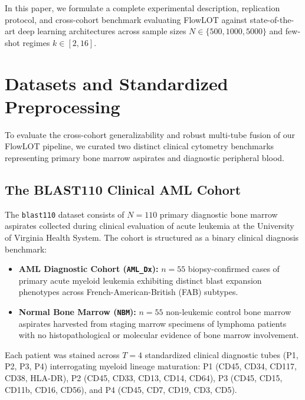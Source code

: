 \documentclass[10pt,journal,compsoc]{IEEEtran}
\begin{document}
In this paper, we formulate a complete experimental description, replication protocol, and cross-cohort benchmark evaluating FlowLOT against state-of-the-art deep learning architectures across sample sizes $N \in \{500, 1000, 5000\}$ and few-shot regimes $k \in [2, 16]$.

\section{Datasets and Standardized Preprocessing}

To evaluate the cross-cohort generalizability and robust multi-tube fusion of our FlowLOT pipeline, we curated two distinct clinical cytometry benchmarks representing primary bone marrow aspirates and diagnostic peripheral blood.

\subsection{The BLAST110 Clinical AML Cohort}
The \texttt{blast110} dataset consists of $N=110$ primary diagnostic bone marrow aspirates collected during clinical evaluation of acute leukemia at the University of Virginia Health System. The cohort is structured as a binary clinical diagnosis benchmark:
\begin{itemize}
    \item \textbf{AML Diagnostic Cohort (\texttt{AML\_Dx}):} $n=55$ biopsy-confirmed cases of primary acute myeloid leukemia exhibiting distinct blast expansion phenotypes across French-American-British (FAB) subtypes.
    \item \textbf{Normal Bone Marrow (\texttt{NBM}):} $n=55$ non-leukemic control bone marrow aspirates harvested from staging marrow specimens of lymphoma patients with no histopathological or molecular evidence of bone marrow involvement.
\end{itemize}
Each patient was stained across $T=4$ standardized clinical diagnostic tubes (P1, P2, P3, P4) interrogating myeloid lineage maturation: P1 (CD45, CD34, CD117, CD38, HLA-DR), P2 (CD45, CD33, CD13, CD14, CD64), P3 (CD45, CD15, CD11b, CD16, CD56), and P4 (CD45, CD7, CD19, CD3, CD5).
\end{document}
